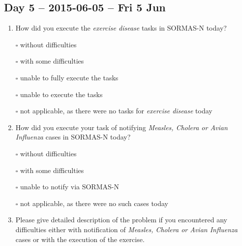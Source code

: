 \documentclass[a4paper, titlepage]{tufte-handout}
\begin{document}
\subsection{Day 5 -- 2015-06-05 -- Fri  5 Jun}
\label{sec-8-5}
\begin{enumerate}
\item How did you execute the \emph{exercise disease} tasks in SORMAS-N today?

\quad $\square$ without difficulties

\quad $\square$ with some difficulties

\quad $\square$ unable to fully execute the tasks

\quad $\square$ unable to execute the tasks

\quad $\square$ not applicable, as there were no tasks for \emph{exercise disease} today

\item How did you execute your task of notifying \emph{Measles, Cholera or Avian Influenza} cases in SORMAS-N today?

\quad $\square$ without difficulties

\quad $\square$ with some difficulties

\quad $\square$ unable to notify via SORMAS-N

\quad $\square$ not applicable, as there were no such cases today

\item Please give detailed description of the problem if you encountered any difficulties either with notification of \emph{Measles, Cholera or Avian Influenza} cases or with the execution of the exercise.

\hrulefill

\hrulefill

\hrulefill

\hrulefill

\hrulefill

\hrulefill

\hrulefill

\hrulefill

\hrulefill

\hrulefill
\end{enumerate}

\newpage
\end{document}
